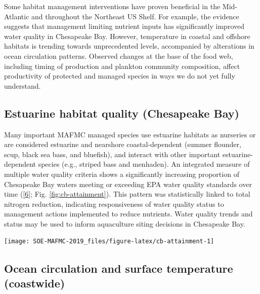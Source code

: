\documentclass[10pt,]{article}
\let\origfigure\figure
\let\endorigfigure\endfigure
\renewenvironment{figure}[1][2] {
    \expandafter\origfigure\expandafter[H]
} {
    \endorigfigure
}
\begin{document}
Some habitat management interventions have proven beneficial in the
Mid-Atlantic and throughout the Northeast US Shelf. For example, the
evidence suggests that management limiting nutrient inputs has
significantly improved water quality in Chesapeake Bay. However,
temperature in coastal and offshore habitats is trending towards
unprecedented levels, accompanied by alterations in ocean circulation
patterns. Observed changes at the base of the food web, including timing
of production and plankton community composition, affect productivity of
protected and managed species in ways we do not yet fully understand.

\subsection{Estuarine habitat quality (Chesapeake
Bay)}\label{estuarine-habitat-quality-chesapeake-bay}

Many important MAFMC managed species use estuarine habitats as nurseries
or are considered estuarine and nearshore coastal-dependent (summer
flounder, scup, black sea bass, and bluefish), and interact with other
important estuarine-dependent species (e.g., striped bass and menhaden).
An integrated measure of multiple water quality criteria shows a
significantly increasing proportion of Chesapeake Bay waters meeting or
exceeding EPA water quality standards over time
({[}\protect\hyperlink{ref-zhang_chesapeake_2018}{6}{]}; Fig.
\ref{fig:cb-attainment}). This pattern was statistically linked to total
nitrogen reduction, indicating responsiveness of water quality status to
management actions implemented to reduce nutrients. Water quality trends
and status may be used to inform aquaculture siting decisions in
Chesapeake Bay.

\begin{figure}

{\centering \texttt{[image: SOE-MAFMC-2019\_files/figure-latex/cb-attainment-1]} 

}

\caption{Estimated water quality standards attainment of Chesapeake Bay tidal waters for the combined assessment of dissolved oxygen, underwater bay grasses/water clarity and chlorophyll a using rolling three year assessment periods.}\label{fig:cb-attainment}
\end{figure}

\subsection{Ocean circulation and surface temperature
(coastwide)}\label{ocean-circulation-and-surface-temperature-coastwide}
\end{document}
